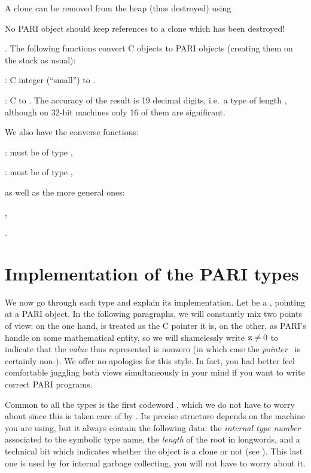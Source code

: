 
A clone can be removed from the heap (thus destroyed) using


\noindent No PARI object should keep references to a clone which has been
destroyed!

.
The following functions convert C objects to PARI objects (creating them on
the stack as usual):

: C  integer  (``small'') to .

: C  to . The accuracy of
the result is 19 decimal digits, i.e.~a type  of length
, although on 32-bit machines only 16 of them are
significant.

\noindent We also have the converse functions:

:  must be of type ,

:  must be of type ,

\noindent as well as the more general ones:

,

.

\section{Implementation of the PARI types}
\label{se:impl}

\noindent
We now go through each type and explain its implementation. Let  be a
, pointing at a PARI object. In the following paragraphs, we will
constantly mix two points of view: on the one hand,  is treated as the
C pointer it is, on the other, as PARI's handle on some mathematical entity,
so we will shamelessly write ${\tt z} \ne 0$ to indicate that the
\emph{value} thus represented is nonzero (in which case the
\emph{pointer}~ is certainly non-). We offer no apologies
for this style. In fact, you had better feel comfortable juggling both views
simultaneously in your mind if you want to write correct PARI programs.

Common to all the types is the first codeword , which we do not
have to worry about since this is taken care of by . Its precise
structure depends on the machine you are using, but it always contain the
following data: the \emph{internal type number} associated
to the symbolic type name, the \emph{length} of the root in longwords, and a
technical bit which indicates whether the object is a clone or not (see
). This last one is used by  for internal garbage
collecting, you will not have to worry about it.

